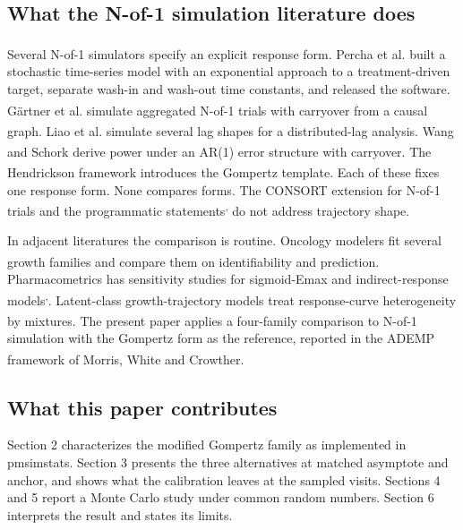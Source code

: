 \documentclass[
  11pt,
]{article}
\begin{document}
\subsection{What the N-of-1 simulation literature does}\label{what-the-n-of-1-simulation-literature-does}

Several N-of-1 simulators specify an explicit response form. Percha et
al.\textsuperscript{} built a stochastic time-series model with an
exponential approach to a treatment-driven target, separate wash-in
and wash-out time constants, and released the software. Gärtner et
al.\textsuperscript{} simulate aggregated N-of-1 trials with
carryover from a causal graph. Liao et al.\textsuperscript{}
simulate several lag shapes for a distributed-lag analysis. Wang and
Schork\textsuperscript{} derive power under an AR(1) error structure
with carryover. The Hendrickson framework\textsuperscript{}
introduces the Gompertz template. Each of these fixes one response
form. None compares forms. The CONSORT extension for N-of-1 trials\textsuperscript{} and the programmatic statements\textsuperscript{,} do not address trajectory shape.

In adjacent literatures the comparison is routine. Oncology modelers
fit several growth families and compare them on identifiability and
prediction\textsuperscript{}. Pharmacometrics has sensitivity
studies for sigmoid-Emax and indirect-response models\textsuperscript{,}. Latent-class
growth-trajectory models treat response-curve heterogeneity by
mixtures\textsuperscript{}. The present paper applies a
four-family comparison to N-of-1 simulation with the Gompertz form as
the reference, reported in the ADEMP framework of Morris, White and
Crowther\textsuperscript{}.

\subsection{What this paper contributes}\label{contrib}

Section 2 characterizes the modified Gompertz family as implemented in
pmsimstats. Section 3 presents the three alternatives at matched
asymptote and anchor, and shows what the calibration leaves at the
sampled visits. Sections 4 and 5 report a Monte Carlo study under
common random numbers. Section 6 interprets the result and states its
limits.
\end{document}

